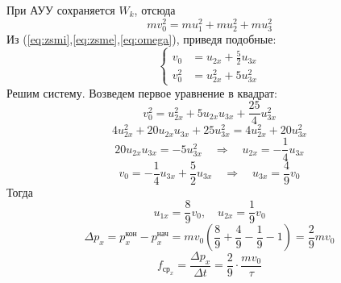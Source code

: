 \documentclass[a5paper,10pt]{article}
\begin{document}
При АУУ сохраняется $W_k$, отсюда
\begin{equation}
    \label{eq:zsme}
    mv_0^2=mu_1^2+
           mu_2^2+
           mu_3^2
\end{equation}
Из (\ref{eq:zsmi},\ref{eq:zsme},\ref{eq:omega}), приведя подобные:
\begin{equation}
    \left\{\begin{aligned}
    v_0 &=                 
                u_{2x}+
                \frac{5}{2}u_{3x}
    \\
    v_0^2 &=
           u_{2x}^2+
          5 u_{3x}^2
    \end{aligned}\right.
\end{equation}
Решим систему. Возведем первое уравнение в квадрат:
\begin{equation}
    v_0^2=u^2_{2x}+5u_{2x}u_{3x}+\frac{25}{4}u^2_{3x} 
\end{equation}
\begin{equation}
    4u^2_{2x}+20u_{2x}u_{3x}+25u^2_{3x}=4u^2_{2x}+20u^2_{3x} 
\end{equation}
\begin{equation}
    20u_{2x}u_{3x}=-5u^2_{3x} 
    \quad\Rightarrow\quad  
    u_{2x}=-\frac14u_{3x}
\end{equation}
\begin{equation}
    v_0=-\frac14u_{3x}+\frac{5}{2}u_{3x}
    \quad\Rightarrow\quad  
    u_{3x}=\frac49v_0
\end{equation}
Тогда  
\begin{equation}
    u_{1x}=\frac89v_0, \quad u_{2x}=\frac19v_0
\end{equation}
\begin{equation}
    \Delta p_x=p_x^\text{кон}-p_x^\text{нач}=mv_0(\frac89+\frac49-\frac19-1)=\frac29mv_0
\end{equation}
\begin{equation}
    f_{\text{ср}_x}=\frac{\Delta p_x}{\Delta t}=\frac{2}{9}\cdot\frac{mv_0}{\tau}
\end{equation}

\end{document}
